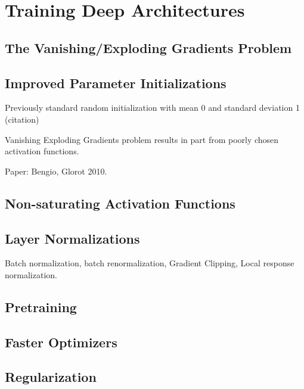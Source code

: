 \section{Training Deep Architectures}

\subsection{The Vanishing/Exploding Gradients Problem}

\subsection{Improved Parameter Initializations}

Previously standard random initialization with mean 0 and standard deviation 1 (citation)


Vanishing Exploding Gradients problem results in part from poorly chosen activation functions.

Paper: Bengio, Glorot 2010.

\subsection{Non-saturating Activation Functions}

\subsection{Layer Normalizations}

Batch normalization, batch renormalization, Gradient Clipping, Local response normalization.

\subsection{Pretraining}

\subsection{Faster Optimizers}

\subsection{Regularization}
